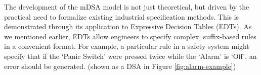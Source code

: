 %


The development of the mDSA model is not just theoretical, but driven by the practical need to formalize existing industrial specification methods. This is demonstrated through its application to {Expressive Decision Tables (EDTs)}. %
As we mentioned earlier, EDTs allow engineers to specify complex, suffix-based rules in a convenient format. 
For example, a particular rule in a safety system might specify that if the `Panic Switch' were pressed twice while the `Alarm' is `Off', an error should be generated. (shown as a DSA in Figure \ref{fig:alarm-example})

